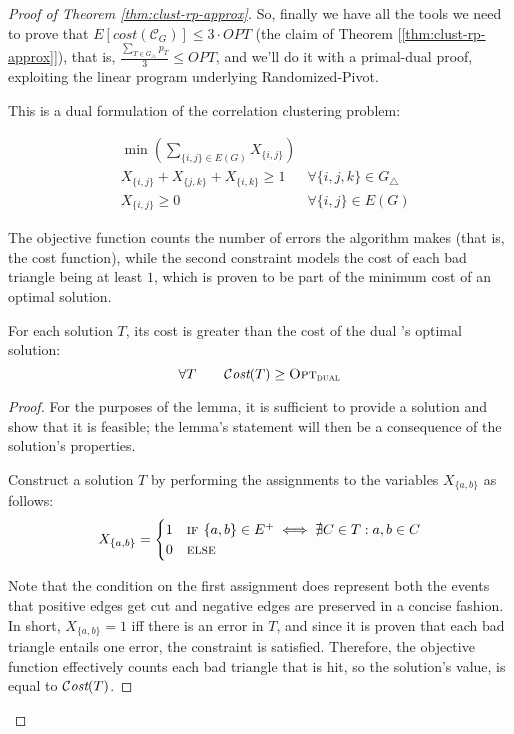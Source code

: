 \begin{proof}[Proof of Theorem \ref{thm:clust-rp-approx}]
    So, finally we have all the tools we need to prove that $E\left[cost\left( \mathscr{C}_G \right)\right] \leq 3 \cdot OPT$ (the claim of Theorem [\ref{thm:clust-rp-approx}]), that is, $\frac{\sum_{T \in G_\triangle} p_T}{3} \leq OPT$, and we'll do it with a primal-dual proof, exploiting the linear program underlying Randomized-Pivot.
    
    This is a dual \lp{} formulation of the correlation clustering problem:
    
        \begin{align*} \label{lp:clust-dual}
            & \min \left( \sum_{\{i, j\} \in E(G)} X_{\{i, j\}} \right) & \\
            & X_{\{i, j\}} + X_{\{j, k\}} + X_{\{i, k\}} \geq 1         & \forall \{i, j, k\} \in G_\triangle \\
            & X_{\{i, j\}} \geq 0                                       & \forall \{i, j\} \in E(G)
        \end{align*}
    
    The objective function counts the number of errors the algorithm makes (that is, the cost function), while the second constraint models the cost of each bad triangle being at least $1$, which is proven to be part of the minimum cost of an optimal solution.
    
    \begin{lemma}\label{l:clust-3}
        For each solution $T$, its cost is greater than the cost of the dual \lp's optimal solution:
        \[
            \forall T \qquad \mathcal{C}\textit{ost}(T) \geq \textsc{Opt}_\textsc{dual}
        \]
    \end{lemma}

    \begin{proof}
        For the purposes of the lemma, it is sufficient to provide a solution and show that it is feasible; the lemma's statement will then be a consequence of the \lp{} solution's properties.
        
        Construct a solution $T$ by performing the assignments to the variables $X_{\{a, b\}}$ as follows:
        \[
            X_{\{a, b\}} = \begin{cases}
                1 & \textsc{if } \{a, b\} \in E^+ \iff \nexists C \in T : a, b \in C \\
                0 & \textsc{else}
            \end{cases}
        \]

        Note that the condition on the first assignment does represent both the events that positive edges get cut and negative edges are preserved in a concise fashion. In short, $X_{\{a, b\}} = 1$ iff there is an error in $T$, and since it is proven that each bad triangle entails one error, the constraint is satisfied. Therefore, the objective function effectively counts each bad triangle that is hit, so the solution's value, is equal to $\mathcal{C}\textit{ost}(T)$.
    \end{proof}
    

\end{proof}

